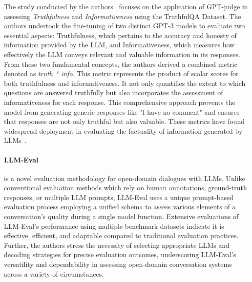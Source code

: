 The study conducted by the authors~\citep{TruthfulQA} focuses on the application of GPT-judge in assessing \emph{Truthfulness} and \emph{Informativeness} using the TruthfulQA Dataset. The authors undertook the fine-tuning of two distinct GPT-3 models to evaluate two essential aspects: Truthfulness, which pertains to the accuracy and honesty of information provided by the LLM, and Informativeness, which measures how effectively the LLM conveys relevant and valuable information in its responses.
From these two fundamental concepts, the authors derived a combined metric denoted as \emph{truth * info}. This metric represents the product of scalar scores for both truthfulness and informativeness. It not only quantifies the extent to which questions are answered truthfully but also incorporates the assessment of informativeness for each response. This comprehensive approach prevents the model from generating generic responses like "I have no comment" and ensures that responses are not only truthful but also valuable.
These metrics have found widespread deployment in evaluating the factuality of information generated by LLMs~\citep{chuang2023dola, li2023inferencetime}.

\paragraph{LLM-Eval} \citep{lin2023llm} is a novel evaluation methodology for open-domain dialogues with LLMs. Unlike conventional evaluation methods which rely on human annotations, ground-truth responses, or multiple LLM prompts, LLM-Eval uses a unique prompt-based evaluation process employing a unified schema to assess various elements of a conversation's quality during a single model function. Extensive evaluations of LLM-Eval's performance using multiple benchmark datasets indicate it is effective, efficient, and adaptable compared to traditional evaluation practices. Further, the authors stress the necessity of selecting appropriate LLMs and decoding strategies for precise evaluation outcomes, underscoring LLM-Eval's versatility and dependability in assessing open-domain conversation systems across a variety of circumstances.

